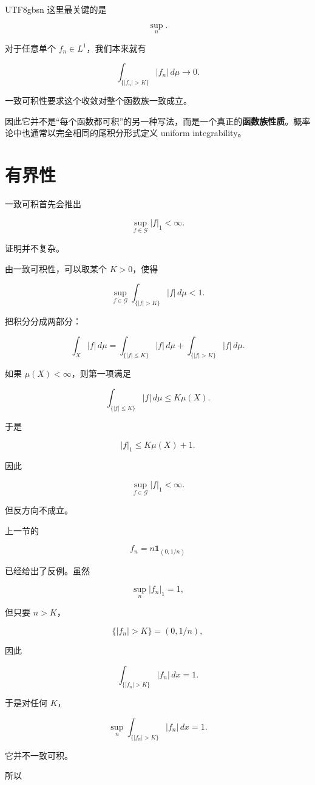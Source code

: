 \documentclass[11pt]{article}
\begin{document}
\begin{CJK*}{UTF8}{gbsn}
这里最关键的是

\[
\sup_n.
\]

对于任意单个 $f_n\in L^1$，我们本来就有

\[
\int_{\{|f_n|>K\}}|f_n|\,d\mu\to0.
\]

一致可积性要求这个收敛对整个函数族一致成立。

因此它并不是“每个函数都可积”的另一种写法，而是一个真正的\textbf{函数族性质}。概率论中也通常以完全相同的尾积分形式定义 uniform integrability。


\section{有界性}


一致可积首先会推出

\[
\sup_{f\in\mathcal G}
|f|_1<\infty.
\]

证明并不复杂。

由一致可积性，可以取某个 $K>0$，使得

\[
\sup_{f\in\mathcal G}
\int_{\{|f|>K\}}|f|\,d\mu
<1.
\]

把积分分成两部分：

\[
\int_X|f|\,d\mu
=
\int_{\{|f|\leq K\}}|f|\,d\mu
+
\int_{\{|f|>K\}}|f|\,d\mu.
\]

如果 $\mu(X)<\infty$，则第一项满足

\[
\int_{\{|f|\leq K\}}|f|\,d\mu
\leq
K\mu(X).
\]

于是

\[
|f|_1
\leq
K\mu(X)+1.
\]

因此

\[
\sup_{f\in\mathcal G}|f|_1<\infty.
\]

但反方向不成立。

上一节的

\[
f_n=n\mathbf1_{(0,1/n)}
\]

已经给出了反例。虽然

\[
\sup_n|f_n|_1=1,
\]

但只要 $n>K$，

\[
\{|f_n|>K\}
=
(0,1/n),
\]

因此

\[
\int_{\{|f_n|>K\}}|f_n|\,dx
=
1.

\]

于是对任何 $K$，

\[
\sup_n
\int_{\{|f_n|>K\}}|f_n|\,dx
=
1.

\]

它并不一致可积。

所以


\end{CJK*}
\end{document}
